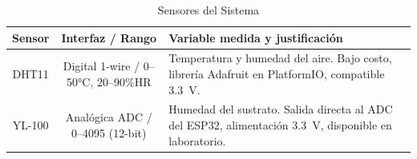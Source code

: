 
\begin{table}[tp]
\centering
\renewcommand{\arraystretch}{1.3}
\caption{Sensores del Sistema}
\label{tab:sensores}
\begin{tabularx}{\textwidth}{|c|c|X|}
\hline
\textbf{Sensor} & \textbf{Interfaz / Rango} & \textbf{Variable medida y justificación} \\
\hline
DHT11 & Digital 1-wire / 0--50°C, 20--90\%HR & Temperatura y humedad del aire. Bajo costo, librería Adafruit en PlatformIO, compatible 3.3~V. \\
\hline
YL-100 & Analógica ADC / 0--4095 (12-bit) & Humedad del sustrato. Salida directa al ADC del ESP32, alimentación 3.3~V, disponible en laboratorio. \\
\hline
\end{tabularx}
\end{table}